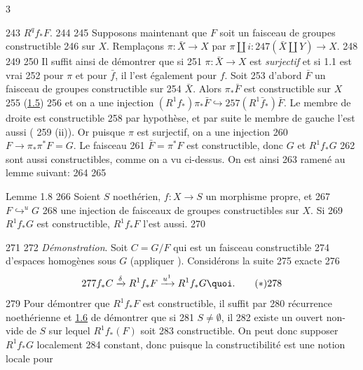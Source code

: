 3	\documentclass[10pt]{../fichiers-configuration-latex/smfart}
\begin{document}
   243	$R^{q}f_{\ast}F$.
   244	
   245	Supposons maintenant que $F$ soit un faisceau de groupes constructible
   246	sur $X$. Remplaçons $\pi:\bar{X}\rightarrow X$ par $\pi\amalg i:
   247	(\bar{X}\amalg Y)\rightarrow X$.
   248	%
   249	%
   250	 Il suffit ainsi de démontrer que si
   251	$\pi:\bar{X}\rightarrow X$ est \emph{surjectif} et si 1.1 est vrai
   252	pour $\pi$ et pour $\bar{f}$, il l'est également pour $f$. Soit
   253	d'abord $\bar{F}$ un faisceau de groupes constructible sur
   254	$\bar{X}$. Alors $\pi_{\ast}\bar{F}$ est constructible sur $X$
   255	(\hyperref[XIV.lem1.5]{1.5}) 
   256	et on a une injection $(R^{1}f_{\ast})\pi_{\ast}\bar{F}\hookrightarrow
   257	(R^{1}\bar{f}_{\ast})\bar{F}$. Le membre de droite est constructible
   258	par hypothèse, et par suite le membre de gauche l'est aussi (
   259	(ii)). Or\sisi{}{,} puisque $\pi$ est surjectif, on a une injection
   260	$F\rightarrow \pi_{\ast}\pi^{\ast}F=G$. Le faisceau
   261	$\bar{F}=\pi^{\ast}F$ est constructible, donc $G$ et $R^{1}f_{\ast}G$
   262	sont aussi constructibles, comme on a vu ci-dessus. On est ainsi
   263	ramené au lemme suivant:
   264	
   265	\begin{enonce*}{Lemme 1.8}
   266	Soient $S$ noethérien, $f:X\rightarrow S$ un morphisme propre, et 
   267	$\displaystyle{F\mathop{\hookrightarrow}^{u}G}$
   268	une injection de faisceaux de groupes constructibles sur $X$. Si
   269	$R^{1}f_{\ast}G$ est constructible, $R^{1}f_{\ast}F$ l'est aussi.
   270	\end{enonce*}
   271	
   272		\emph{Démonstration}. Soit $C=G/F$ qui est un faisceau constructible
   274	d'espaces homogènes sous $G$ (appliquer ). Considérons la suite
   275	exacte
   276	\begin{equation*}
   277	f_{\ast}C\xrightarrow{\delta}R^{1}f_{\ast}F\xrightarrow{u^{1}}R^{1}f_{\ast}G{\quoi}.\tag{$\ast$}
   278	\end{equation*}
   279	Pour démontrer que $R^{1}f_{\ast}F$ est constructible, il suffit par
   280	récurrence noethérienne et \hyperref[XIV.lem1.6]{1.6} de démontrer que si 
   281	$S\neq ∅$, il 
   282	existe un ouvert non-vide de $S$ sur lequel $R^{1}f_{\ast}(F)$ soit
   283	constructible. On peut donc supposer $R^{1}f_{\ast}G$ localement
   284	constant, donc puisque la constructibilité est une notion locale pour
\end{document}
